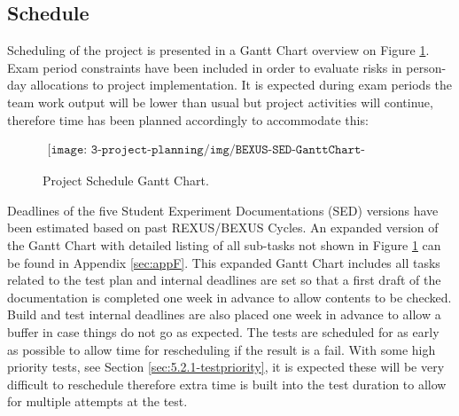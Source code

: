 \subsection{Schedule}

Scheduling of the project is presented in a Gantt Chart overview on Figure \ref{fig:schedule-gantt-chart}. Exam period constraints have been included in order to evaluate risks in person-day allocations to project implementation. It is expected during exam periods the team work output will be lower than usual but project activities will continue, therefore time has been planned accordingly to accommodate this:

\begin{figure}[H]
    \begin{align*}
        \texttt{[image: 3-project-planning/img/BEXUS-SED-GanttChart-Overview.png]}
    \end{align*}
    \caption{Project Schedule Gantt Chart.}\label{fig:schedule-gantt-chart}
\end{figure}

Deadlines of the five Student Experiment Documentations (SED) versions have been estimated based on past REXUS/BEXUS Cycles. An expanded version of the Gantt Chart with detailed listing of all sub-tasks not shown in Figure \ref{fig:schedule-gantt-chart} can be found in Appendix \ref{sec:appF}. This expanded Gantt Chart includes all tasks related to the test plan and internal deadlines are set so that a first draft of the documentation is completed one week in advance to allow contents to be checked. Build and test internal deadlines are also placed one week in advance to allow a buffer in case things do not go as expected. The tests are scheduled for as early as possible to allow time for rescheduling if the result is a fail. With some high priority tests, see Section \ref{sec:5.2.1-testpriority}, it is expected these will be very difficult to reschedule therefore extra time is built into the test duration to allow for multiple attempts at the test.

